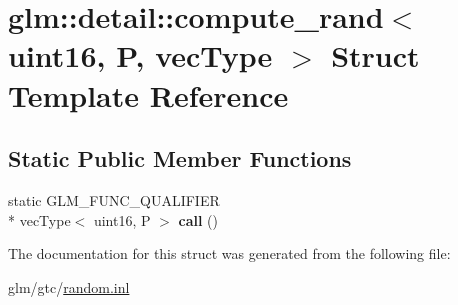 \hypertarget{structglm_1_1detail_1_1compute__rand_3_01uint16_00_01P_00_01vecType_01_4}{\section{glm\-:\-:detail\-:\-:compute\-\_\-rand$<$ uint16, P, vec\-Type $>$ Struct Template Reference}
\label{structglm_1_1detail_1_1compute__rand_3_01uint16_00_01P_00_01vecType_01_4}
}
\subsection*{Static Public Member Functions}
\begin{DoxyCompactItemize}
\item 
\hypertarget{structglm_1_1detail_1_1compute__rand_3_01uint16_00_01P_00_01vecType_01_4_ae07d663b72169f25cbd1235917acbff8}{static G\-L\-M\-\_\-\-F\-U\-N\-C\-\_\-\-Q\-U\-A\-L\-I\-F\-I\-E\-R \\*
vec\-Type$<$ uint16, P $>$ {\bfseries call} ()}\label{structglm_1_1detail_1_1compute__rand_3_01uint16_00_01P_00_01vecType_01_4_ae07d663b72169f25cbd1235917acbff8}

\end{DoxyCompactItemize}


The documentation for this struct was generated from the following file\-:\begin{DoxyCompactItemize}
\item 
glm/gtc/\hyperlink{random_8inl}{random.\-inl}\end{DoxyCompactItemize}
